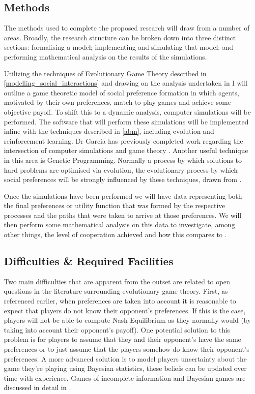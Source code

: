 \documentclass[11pt]{article}
\newcommand*{\np}{\par\noindent\newline}
\begin{document}
\subsection{Methods}
The methods used to complete the proposed research will draw from a number of
areas. Broadly, the research structure can be broken down into three distinct
sections: formalising a model; implementing and simulating that model; and
performing mathematical analysis on the results of the simulations.
\np Utilizing the techniques of Evolutionary Game Theory described in
\ref{modelling_social_interactions} and drawing on the analysis undertaken in
\cite{alger_homo_2013} I will outline a game theoretic model of social
preference formation in which agents, motivated by their own preferences, match
to play games and achieve some objective payoff. To shift this to a dynamic
analysis, computer simulations will be performed. The software that will
perform these simulations will be implemented inline with the techniques
described in \ref{abm}, including evolution and reinforcement learning. Dr
Garcia has previously completed work regarding the intersection of computer
simulations and game theory \cite{garcia_no_2018}. Another useful technique in
this area is Genetic Programming. Normally a process by which solutions to hard
problems are optimised via evolution, the evolutionary process by which social
preferences will be strongly influenced by these techniques, drawn from
\cite{poli_field_2008}.
\np Once the simulations have been performed we will have data representing
both the final preferences or utility function that was formed by the
respective processes and the paths that were taken to arrive at those
preferences. We will then perform some mathematical analysis on this data to
investigate, among other things, the level of cooperation achieved and how this compares to \cite{alger_homo_2013}.

\subsection{Difficulties \& Required Facilities}
Two main difficulties that are apparent from the outset are related to open
questions in the literature surrounding evolutionary game theory. First, as
referenced earlier, when preferences are taken into account it is reasonable to
expect that players do not know their opponent's preferences. If this is the case, players will not be able to compute Nash Equilibrium as they normally
would (by taking into account their opponent's payoff). One potential solution
to this problem is for players to assume that they and their opponent's have
the same preferences or to just assume that the players somehow do know their
opponent's preferences. A more advanced solution is to model players
uncertainty about the game they're playing using Bayesian statistics, these
beliefs can be updated over time with experience. Games of incomplete
information and Bayesian games are discussed in detail in
\cite{shoham_multiagent_2008}.
\end{document}
